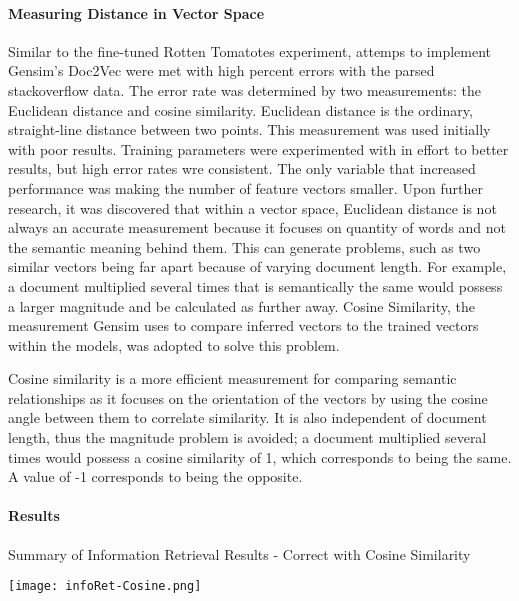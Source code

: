 \paragraph{Measuring Distance in Vector Space} Similar to the fine-tuned Rotten Tomatotes experiment, attemps to implement Gensim's Doc2Vec were met with high percent errors with the parsed stackoverflow data. The error rate was determined by two measurements: the Euclidean distance and cosine similarity. Euclidean distance is the ordinary, straight-line distance between two points. This measurement was used initially with poor results. Training parameters were experimented with in effort to better results, but high error rates wre consistent. The only variable that increased performance was making the number of feature vectors smaller. Upon further research, it was discovered that within a vector space, Euclidean distance is not always an accurate measurement because it focuses on quantity of words and not the semantic meaning behind them. \cite{RefWorks:doc:5aa695dbe4b0e15a211a9ae7} This can generate problems, such as two similar vectors being far apart because of varying document length. For example, a document multiplied several times that is semantically the same would possess a larger magnitude and be calculated as further away. Cosine Similarity, the measurement Gensim uses to compare inferred vectors to the trained vectors within the models, was adopted to solve this problem.

Cosine similarity is a more efficient measurement for comparing semantic relationships as it focuses on the orientation of the vectors by using the cosine angle between them to correlate similarity. \cite{RefWorks:doc:5aa695dbe4b0e15a211a9ae7} It is also independent of document length, thus the magnitude problem is avoided; a document multiplied several times would possess a cosine similarity of 1, which corresponds to being the same. A value of -1 corresponds to being the opposite. 

\paragraph{Results}

\begin{table}[ht]
\caption{Summary of Information Retrieval Results - Correct with Cosine Similarity}
\label{results_of_information_retrieval_cosine}
\centering
\texttt{[image: infoRet-Cosine.png]}
\end{table}

